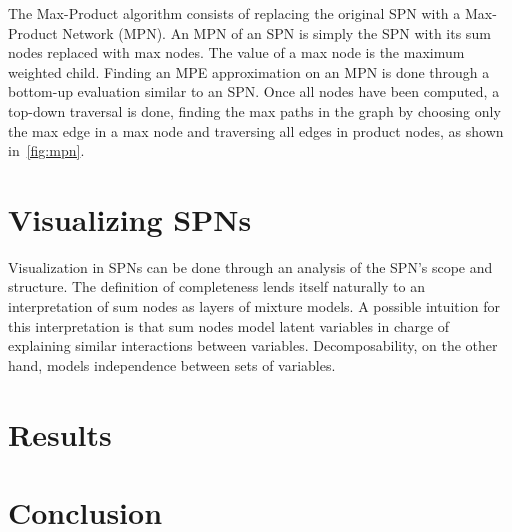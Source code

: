 \documentclass{article}
\begin{document}
The Max-Product algorithm consists of replacing the original SPN with a Max-Product Network (MPN).
An MPN of an SPN is simply the SPN with its sum nodes replaced with max nodes. The value of a max
node is the maximum weighted child. Finding an MPE approximation on an MPN is done through a
bottom-up evaluation similar to an SPN. Once all nodes have been computed, a top-down traversal is
done, finding the max paths in the graph by choosing only the max edge in a max node and traversing
all edges in product nodes, as shown in~\autoref{fig:mpn}.

\section{Visualizing SPNs}
\label{sec:visual}

Visualization in SPNs can be done through an analysis of the SPN's scope and structure. The
definition of completeness lends itself naturally to an interpretation of sum nodes as layers of
mixture models. A possible intuition for this interpretation is that sum nodes model latent
variables in charge of explaining similar interactions between variables. Decomposability, on the
other hand, models independence between sets of variables.



\section{Results}
\label{sec:results}

\section{Conclusion}
\label{sec:conc}


\end{document}
